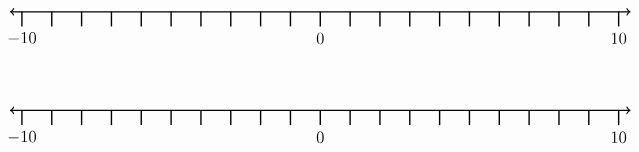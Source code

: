 \documentclass[leqno, 12pt]{article}
\begin{document}
\vspace{10pt}\begin{equation}
    \begin{tikzpicture}[scale=0.75, baseline={([yshift=-1pt]current bounding box.north)}]
        \draw[{To[scale=1.3]}-{To[scale=1.3]}, line width=1pt] (-10.4, 0) -- (10.4, 0);
        \foreach \x in {-10,-9,...,10}
            \draw[shift={(\x,0)},color=black, line width=1pt] (0pt,-14pt) -- (0pt,0pt);
        \foreach \x in {-10,0,10}
            \draw[shift={(\x,-0.8)},color=black] node[font=\large,text height=12pt] {$\x$};
        \node [font=\large, minimum width=30mm] at (11.0,1.2) {$  $};
    \end{tikzpicture}
\end{equation}
\vspace{10pt}\begin{equation}
    \begin{tikzpicture}[scale=0.75, baseline={([yshift=-1pt]current bounding box.north)}]
        \draw[{To[scale=1.3]}-{To[scale=1.3]}, line width=1pt] (-10.4, 0) -- (10.4, 0);
        \foreach \x in {-10,-9,...,10}
            \draw[shift={(\x,0)},color=black, line width=1pt] (0pt,-14pt) -- (0pt,0pt);
        \foreach \x in {-10,0,10}
            \draw[shift={(\x,-0.8)},color=black] node[font=\large,text height=12pt] {$\x$};
        \node [font=\large, minimum width=30mm] at (11.0,1.2) {$  $};
    \end{tikzpicture}
\end{equation}
\vspace{10pt}
\end{document}
